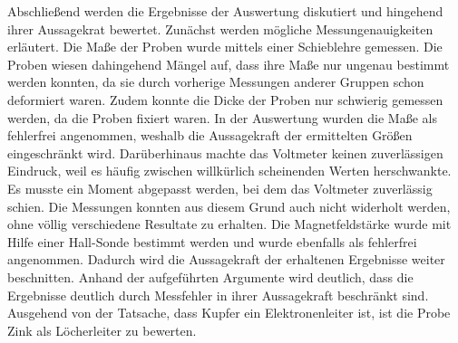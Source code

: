 Abschließend werden die Ergebnisse der Auswertung diskutiert und hingehend ihrer
Aussagekrat bewertet. Zunächst werden mögliche Messungenauigkeiten erläutert.
Die Maße der Proben wurde mittels einer Schieblehre gemessen. Die Proben wiesen
dahingehend Mängel auf, dass ihre Maße nur ungenau bestimmt werden konnten, da sie
durch vorherige Messungen anderer Gruppen schon deformiert waren. Zudem konnte
die Dicke der Proben nur schwierig gemessen werden, da die Proben fixiert waren.
In der Auswertung wurden die Maße als fehlerfrei angenommen, weshalb die Aussagekraft
der ermittelten Größen eingeschränkt wird. Darüberhinaus machte das Voltmeter keinen
zuverlässigen Eindruck, weil es häufig zwischen willkürlich scheinenden Werten
herschwankte. Es musste ein Moment abgepasst werden, bei dem das Voltmeter zuverlässig
schien. Die Messungen konnten aus diesem Grund auch nicht widerholt werden, ohne
völlig verschiedene Resultate zu erhalten. Die Magnetfeldstärke wurde mit Hilfe
einer Hall-Sonde bestimmt werden und wurde ebenfalls als fehlerfrei angenommen.
Dadurch wird die Aussagekraft der erhaltenen Ergebnisse weiter beschnitten.
Anhand der aufgeführten Argumente wird deutlich, dass die Ergebnisse deutlich
durch Messfehler in ihrer Aussagekraft beschränkt sind.\\
Ausgehend von der Tatsache, dass Kupfer ein Elektronenleiter ist, ist die
Probe Zink als Löcherleiter zu bewerten.



